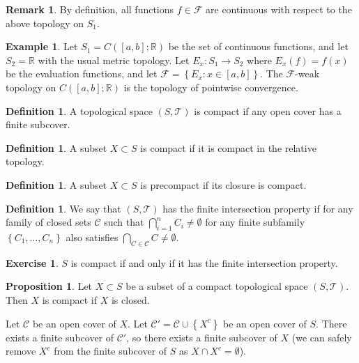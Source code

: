\documentclass[11pt]{article}
\theoremstyle{definition}
\newtheorem{defn}[thm]{Definition}
\newtheorem{example}[thm]{Example}
\newtheorem{exe}[thm]{Exercise}
\newtheorem{prop}[thm]{Proposition}
\newtheorem{remark}[thm]{Remark}
\newcommand{\set}[1]{\left\{ #1 \right\}}
\newcommand{\RR}{\mathbb{R}}
\newcommand{\m}[1]{\mathcal{#1}}
\begin{document}
\begin{remark}
By definition, all functions $f\in\m{F}$ are continuous with respect to the above topology
on $S_1$.
\end{remark}

\begin{example}
Let $S_1=C([a,b];\RR)$ be the set of continuous functions, and let $S_2=\RR$ with the usual
metric topology. Let $E_x:S_1\to S_2$ where $E_x(f)=f(x)$ be the evaluation functions, and
let $\m{F}=\set{E_x:x\in[a,b]}$. The $\m{F}$-weak topology on $C([a,b];\RR)$ is the
topology of pointwise convergence.
\end{example}

\begin{defn}
A topological space $(S,\m{T})$ is compact if any open cover has a finite subcover.
\end{defn}


\begin{defn}
A subset $X\subset S$ is compact if it is compact in the relative topology.
\end{defn}

\begin{defn}
A subset $X\subset S$ is precompact if its closure is compact.
\end{defn}

\begin{defn}
We say that $(S,\m{T})$ has the finite intersection property if for any family of closed
sets $\m{C}$ such that $\bigcap_{i=1}^nC_i\neq\emptyset$ for any finite subfamily
$\set{C_1,...,C_n}$ also satisfies $\bigcap_{C\in\m{C}}C\neq\emptyset$.
\end{defn}

\begin{exe}
$S$ is compact if and only if it has the finite intersection property.
\end{exe}

\begin{prop}
Let $X\subset S$ be a subset of a compact topological space $(S,\m{T})$. Then $X$ is
compact if $X$ is closed.
\end{prop}
\proof
Let $\m{C}$ be an open cover of $X$. Let $\m{C}'=\m{C}\cup\set{X^c}$ be an open cover of
$S$. There exists a finite subcover of $\m{C}'$, so there exists a finite subcover of $X$
(we can safely remove $X^c$ from the finite subcover of $S$ as $X\cap X^c=\emptyset$).
\qedhere
\end{document}
